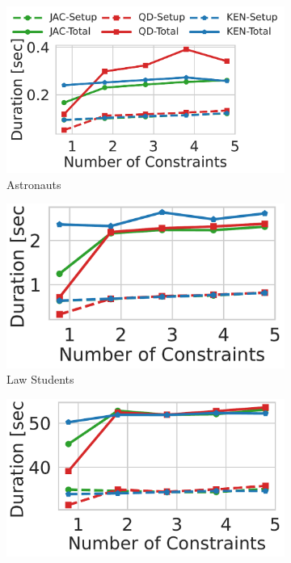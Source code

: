 \begin{figure}[t]
    \begin{subfigure}{.35\textwidth}
      \centering
      \includegraphics[width=.87\linewidth]{figures/astr_num.pdf}
      \hspace{-0.54cm}
      \caption{Astronauts}
      \label{fig:r13}
    \end{subfigure}
    \begin{subfigure}{.35\textwidth}
      \centering
      \includegraphics[width=.75\linewidth]{figures/law_num.pdf}
      \caption{Law Students}
      \label{fig:r14}
    \end{subfigure}
    \begin{subfigure}{.35\textwidth}
      \centering
      \includegraphics[width=.75\linewidth]{figures/meps_num.pdf}

\end{subfigure}
\end{figure}
